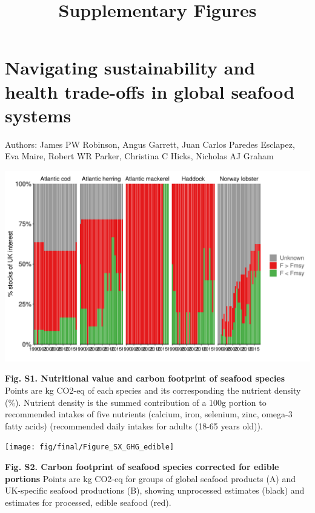 \documentclass[
]{article}
\title{\textbf{Supplementary Figures}}
\author{}
\date{\vspace{-2.5em}}
\begin{document}
\maketitle

\hypertarget{navigating-sustainability-and-health-trade-offs-in-global-seafood-systems}{%
\section{Navigating sustainability and health trade-offs in global
seafood
systems}\label{navigating-sustainability-and-health-trade-offs-in-global-seafood-systems}}

Authors: James PW Robinson, Angus Garrett, Juan Carlos Paredes Esclapez,
Eva Maire, Robert WR Parker, Christina C Hicks, Nicholas AJ Graham

\newpage

\begin{center}\includegraphics[height=0.8\textheight]{fig/final/FigureS1_nutrient_ghg} \end{center}

\textbf{Fig. S1. Nutritional value and carbon footprint of seafood
species} Points are kg CO2-eq of each species and its corresponding the
nutrient density (\%). Nutrient density is the summed contribution of a
100g portion to recommended intakes of five nutrients (calcium, iron,
selenium, zinc, omega-3 fatty acids) (recommended daily intakes for
adults (18-65 years old)).

\newpage

\begin{center}\texttt{[image: fig/final/Figure\_SX\_GHG\_edible]} \end{center}

\textbf{Fig. S2. Carbon footprint of seafood species corrected for
edible portions} Points are kg CO2-eq for groups of global seafood
products (A) and UK-specific seafood productions (B), showing
unprocessed estimates (black) and estimates for processed, edible
seafood (red).
\end{document}
